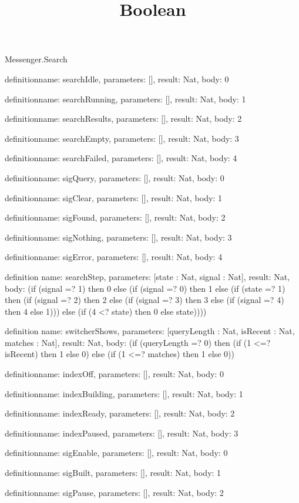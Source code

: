 \begin{lexlean}{Messenger.Search}
\title{Boolean}
\begin{semanticmodule}
definition{name: searchIdle, parameters: [], result: Nat, body: 0}

definition{name: searchRunning, parameters: [], result: Nat, body: 1}

definition{name: searchResults, parameters: [], result: Nat, body: 2}

definition{name: searchEmpty, parameters: [], result: Nat, body: 3}

definition{name: searchFailed, parameters: [], result: Nat, body: 4}

definition{name: sigQuery, parameters: [], result: Nat, body: 0}

definition{name: sigClear, parameters: [], result: Nat, body: 1}

definition{name: sigFound, parameters: [], result: Nat, body: 2}

definition{name: sigNothing, parameters: [], result: Nat, body: 3}

definition{name: sigError, parameters: [], result: Nat, body: 4}

definition{
  name: searchStep,
  parameters: [state : Nat, signal : Nat],
  result: Nat,
  body: (if (signal =? 1) then 0 else (if (signal =? 0) then 1 else (if (state =? 1) then (if (signal =? 2) then 2 else (if (signal =? 3) then 3 else (if (signal =? 4) then 4 else 1))) else (if (4 <? state) then 0 else state))))
}

definition{
  name: switcherShows,
  parameters: [queryLength : Nat, isRecent : Nat, matches : Nat],
  result: Nat,
  body: (if (queryLength =? 0) then (if (1 <=? isRecent) then 1 else 0) else (if (1 <=? matches) then 1 else 0))
}

definition{name: indexOff, parameters: [], result: Nat, body: 0}

definition{name: indexBuilding, parameters: [], result: Nat, body: 1}

definition{name: indexReady, parameters: [], result: Nat, body: 2}

definition{name: indexPaused, parameters: [], result: Nat, body: 3}

definition{name: sigEnable, parameters: [], result: Nat, body: 0}

definition{name: sigBuilt, parameters: [], result: Nat, body: 1}

definition{name: sigPause, parameters: [], result: Nat, body: 2}


\end{semanticmodule}
\end{lexlean}
